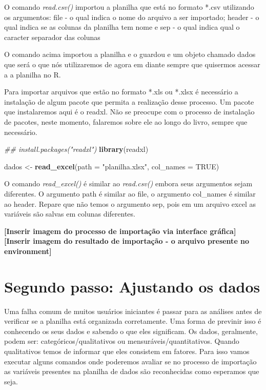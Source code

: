 \documentclass[]{book}
\newenvironment{Shaded}{\begin{snugshade}}{\end{snugshade}}
\newcommand{\CommentTok}[1]{\textcolor[rgb]{0.56,0.35,0.01}{\textit{#1}}}
\newcommand{\DataTypeTok}[1]{\textcolor[rgb]{0.13,0.29,0.53}{#1}}
\newcommand{\KeywordTok}[1]{\textcolor[rgb]{0.13,0.29,0.53}{\textbf{#1}}}
\newcommand{\NormalTok}[1]{#1}
\newcommand{\OtherTok}[1]{\textcolor[rgb]{0.56,0.35,0.01}{#1}}
\newcommand{\StringTok}[1]{\textcolor[rgb]{0.31,0.60,0.02}{#1}}
\begin{document}
O comando \emph{read.csv()} importou a planilha que está no formato *.csv utilizando os argumentos: file - o qual indica o nome do arquivo a ser importado; header - o qual indica se as colunas da planilha tem nome e sep - o qual indica qual o caracter separador das colunas

O comando acima importou a planilha e o guardou e um objeto chamado dados que será o que nós utilizaremos de agora em diante sempre que quisermos acessar a a planilha no R.

Para importar arquivos que estão no formato *.xls ou *.xlsx é necessário a instalação de algum pacote que permita a realização desse processo. Um pacote que instalaremos aqui é o readxl. Não se preocupe com o processo de instalação de pacotes, neste momento, falaremos sobre ele ao longo do livro, sempre que necessário.

\begin{Shaded}
\begin{Highlighting}[]
\CommentTok{## install.packages("readxl")}
\KeywordTok{library}\NormalTok{(readxl)}
\end{Highlighting}
\end{Shaded}

\begin{Shaded}
\begin{Highlighting}[]
\NormalTok{dados <-}\StringTok{ }\KeywordTok{read_excel}\NormalTok{(}\DataTypeTok{path =} \StringTok{"planilha.xlsx"}\NormalTok{, }\DataTypeTok{col_names =} \OtherTok{TRUE}\NormalTok{)}
\end{Highlighting}
\end{Shaded}

O comando \emph{read\_excel()} é similar ao \emph{read.csv()} embora seus argumentos sejam diferentes. O argumento path é similar ao file, o argumento col\_names é similar ao header. Repare que não temos o argumento sep, pois em um arquivo excel as variáveis são salvas em colunas diferentes.

\textbf{{[}Inserir imagem do processo de importação via interface gráfica{]}}
\textbf{{[}Inserir imagem do resultado de importação - o arquivo presente no environment{]}}

\hypertarget{segundo-passo-ajustando-os-dados}{%
\section{Segundo passo: Ajustando os dados}\label{segundo-passo-ajustando-os-dados}}

Uma falha comum de muitos usuários iniciantes é passar para as análises antes de verificar se a planilha está organizada corretamente. Uma forma de previnir isso é conhecendo os seus dados e sabendo o que eles significam. Os dados, geralmente, podem ser: categóricos/qualitativos ou mensuráveis/quantitativos. Quando qualitativos temos de informar que eles consistem em fatores. Para isso vamos executar alguns comandos onde poderemos avaliar se no processo de importação as variáveis presentes na planilha de dados são reconhecidas como esperamos que seja.
\end{document}
